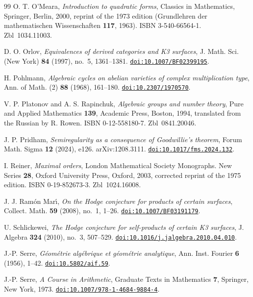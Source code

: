 \documentclass[11pt,reqno]{amsart}
\numberwithin{equation}{section}
\theoremstyle{plain}
\theoremstyle{definition}
\begin{document}
\begin{thebibliography}{99}
O. T. O'Meara,
\emph{Introduction to quadratic forms},
Classics in Mathematics, Springer, Berlin, 2000, reprint of the 1973 edition (Grundlehren der mathematischen Wissenschaften \textbf{117}, 1963). ISBN 3-540-66564-1. Zbl~1034.11003.

D. O. Orlov,
\emph{Equivalences of derived categories and K3 surfaces},
J. Math. Sci. (New York) \textbf{84} (1997), no.~5, 1361--1381.
\href{https://doi.org/10.1007/BF02399195}{\nolinkurl{doi:10.1007/BF02399195}}.

H. Pohlmann,
\emph{Algebraic cycles on abelian varieties of complex multiplication type},
Ann. of Math. (2) \textbf{88} (1968), 161--180.
\href{https://doi.org/10.2307/1970570}{\nolinkurl{doi:10.2307/1970570}}.

V. P. Platonov and A. S. Rapinchuk,
\emph{Algebraic groups and number theory},
Pure and Applied Mathematics \textbf{139}, Academic Press, Boston, 1994, translated from the Russian by R. Rowen. ISBN 0-12-558180-7. Zbl~0841.20046.

J. P. Pridham,
\emph{Semiregularity as a consequence of Goodwillie's theorem},
Forum Math. Sigma \textbf{12} (2024), e126. arXiv:1208.3111.
\href{https://doi.org/10.1017/fms.2024.132}{\nolinkurl{doi:10.1017/fms.2024.132}}.

I. Reiner,
\emph{Maximal orders},
London Mathematical Society Monographs. New Series \textbf{28}, Oxford University Press, Oxford, 2003, corrected reprint of the 1975 edition. ISBN 0-19-852673-3. Zbl~1024.16008.

J. J. Ram\'on Mar\'{\i},
\emph{On the Hodge conjecture for products of certain surfaces},
Collect. Math. \textbf{59} (2008), no.~1, 1--26.
\href{https://doi.org/10.1007/BF03191179}{\nolinkurl{doi:10.1007/BF03191179}}.

U. Schlickewei,
\emph{The Hodge conjecture for self-products of certain K3 surfaces},
J. Algebra \textbf{324} (2010), no.~3, 507--529.
\href{https://doi.org/10.1016/j.jalgebra.2010.04.010}{\nolinkurl{doi:10.1016/j.jalgebra.2010.04.010}}.

J.-P. Serre,
\emph{G\'eom\'etrie alg\'ebrique et g\'eom\'etrie analytique},
Ann. Inst. Fourier \textbf{6} (1956), 1--42.
\href{https://doi.org/10.5802/aif.59}{\nolinkurl{doi:10.5802/aif.59}}.

J.-P. Serre,
\emph{A Course in Arithmetic},
Graduate Texts in Mathematics \textbf{7}, Springer, New York, 1973.
\href{https://doi.org/10.1007/978-1-4684-9884-4}{\nolinkurl{doi:10.1007/978-1-4684-9884-4}}.


\end{thebibliography}
\end{document}
